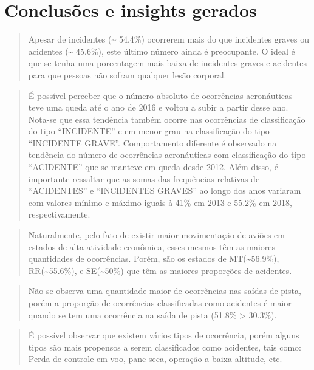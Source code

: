 \documentclass[
]{article}
\begin{document}
\hypertarget{conclusuxf5es-e-insights-gerados}{%
\section{Conclusões e insights
gerados}\label{conclusuxf5es-e-insights-gerados}}

\begin{quote}
Apesar de incidentes (\textasciitilde{} 54.4\%) ocorrerem mais do que
incidentes graves ou acidentes (\textasciitilde{} 45.6\%), este último
número ainda é preocupante. O ideal é que se tenha uma porcentagem mais
baixa de incidentes graves e acidentes para que pessoas não sofram
qualquer lesão corporal.
\end{quote}

\begin{quote}
É possível perceber que o número absoluto de ocorrências aeronáuticas
teve uma queda até o ano de 2016 e voltou a subir a partir desse ano.
Nota-se que essa tendência também ocorre nas ocorrências de
classificação do tipo ``INCIDENTE'' e em menor grau na classificação do
tipo ``INCIDENTE GRAVE''. Comportamento diferente é observado na
tendência do número de ocorrências aeronáuticas com classificação do
tipo ``ACIDENTE'' que se manteve em queda desde 2012. Além disso, é
importante ressaltar que as somas das frequências relativas de
``ACIDENTES'' e ``INCIDENTES GRAVES'' ao longo dos anos variaram com
valores mínimo e máximo iguais à 41\% em 2013 e 55.2\% em 2018,
respectivamente.
\end{quote}

\begin{quote}
Naturalmente, pelo fato de existir maior movimentação de aviões em
estados de alta atividade econômica, esses mesmos têm as maiores
quantidades de ocorrências. Porém, são os estados de
MT(\textasciitilde56.9\%), RR(\textasciitilde55.6\%), e
SE(\textasciitilde50\%) que têm as maiores proporções de acidentes.
\end{quote}

\begin{quote}
Não se observa uma quantidade maior de ocorrências nas saídas de pista,
porém a proporção de ocorrências classificadas como acidentes é maior
quando se tem uma ocorrência na saída de pista (51.8\% \textgreater{}
30.3\%).
\end{quote}

\begin{quote}
É possível observar que existem vários tipos de ocorrência, porém alguns
tipos são mais propensos a serem classificados como acidentes, tais
como: Perda de controle em voo, pane seca, operação a baixa altitude,
etc.
\end{quote}
\end{document}
